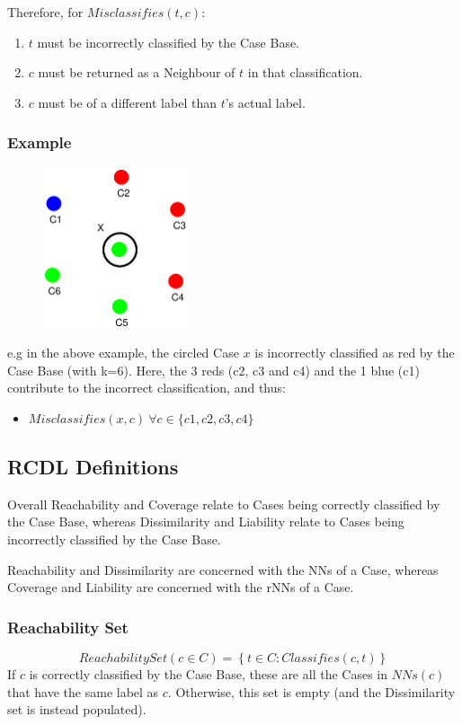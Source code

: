 \documentclass[a4paper,11pt]{report}
\begin{document}
Therefore, for $ Misclassifies(t, c) $:
\begin{enumerate}
	\item $t$ must be incorrectly classified by the Case Base.
	\item $c$ must be returned as a Neighbour of $t$ in that classification.
	\item $c$ must be of a different label than $t$'s actual label.
\end{enumerate}

\subsubsection{Example}
\begin{figure}[h!] \centering
\includegraphics[width=120pt]{./Drawn/EqualDistanceMisclassifiesEg}
\end{figure}

e.g  in the above example, the circled Case $x$ is incorrectly classified as red by the Case Base (with k=6). Here, the 3 reds (c2, c3 and c4) and the 1 blue (c1) contribute to the incorrect classification, and thus:
\begin{itemize}
	\item $Misclassifies(x,c)~\forall c\in\{c1,c2,c3,c4\}$
\end{itemize}


\subsection{RCDL Definitions}
Overall Reachability and Coverage relate to Cases being correctly classified by the Case Base, whereas Dissimilarity and Liability relate to Cases being incorrectly classified by the Case Base.

Reachability and Dissimilarity are concerned with the NNs of a Case, whereas Coverage and Liability are concerned with the rNNs of a Case.

\subsubsection{Reachability Set}
\[ ReachabilitySet(c \in C) = \left\lbrace t \in C : Classifies(c, t) \right\rbrace \] 
If $c$ is correctly classified by the Case Base, these are all the Cases in $ NNs(c) $ that have the same label as $c$. Otherwise, this set is empty (and the Dissimilarity set is instead populated).
\end{document}
